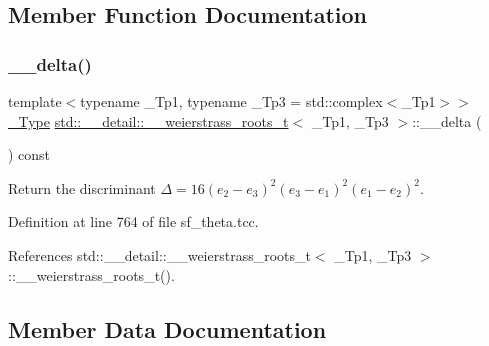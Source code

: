 \subsection{Member Function Documentation}
\mbox{\label{structstd_1_1____detail_1_1____weierstrass__roots__t_a03182b9fb82a1895dde603836e659776}} 
\subsubsection{\texorpdfstring{\+\_\+\+\_\+delta()}{\_\_delta()}}
{\footnotesize\ttfamily template$<$typename \+\_\+\+Tp1, typename \+\_\+\+Tp3 = std\+::complex$<$\+\_\+\+Tp1$>$$>$ \\
\hyperlink{structstd_1_1____detail_1_1____weierstrass__roots__t_acda3e0386962aea322dea870977b67ed}{\+\_\+\+Type} \hyperlink{structstd_1_1____detail_1_1____weierstrass__roots__t}{std\+::\+\_\+\+\_\+detail\+::\+\_\+\+\_\+weierstrass\+\_\+roots\+\_\+t}$<$ \+\_\+\+Tp1, \+\_\+\+Tp3 $>$\+::\+\_\+\+\_\+delta (\begin{DoxyParamCaption}{ }\end{DoxyParamCaption}) const\hspace{0.3cm}{\ttfamily [inline]}}



Return the discriminant $ \Delta = 16(e_2 - e_3)^2(e_3 - e_1)^2(e_1 - e_2)^2 $. 



Definition at line 764 of file sf\+\_\+theta.\+tcc.



References std\+::\+\_\+\+\_\+detail\+::\+\_\+\+\_\+weierstrass\+\_\+roots\+\_\+t$<$ \+\_\+\+Tp1, \+\_\+\+Tp3 $>$\+::\+\_\+\+\_\+weierstrass\+\_\+roots\+\_\+t().



\subsection{Member Data Documentation}
\mbox{\label{structstd_1_1____detail_1_1____weierstrass__roots__t_a65ec7bd3b4996c0fac31474aeb7fcb83}} 
